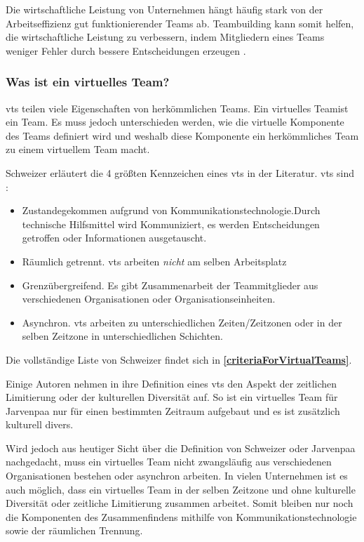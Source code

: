 \documentclass[a4paper,11pt]{article}%
\renewcommand{\\}{\vspace*{0.5\baselineskip} \newline}
\begin{document}
Die wirtschaftliche Leistung von Unternehmen hängt häufig stark von der Arbeitseffizienz gut funktionierender Teams ab. Teambuilding kann somit helfen, die wirtschaftliche Leistung zu verbessern, indem Mitgliedern eines Teams weniger Fehler durch bessere Entscheidungen erzeugen \citep[p. 1-6]{biech2007pfeiffer}.

\subsubsection{Was ist ein virtuelles Team?}
\label{vts}

\ac{vts} teilen viele Eigenschaften von herkömmlichen Teams. Ein \dq virtuelles Team\dq ist ein \dq Team\dq. Es muss jedoch unterschieden werden, wie die virtuelle Komponente des Teams definiert wird und weshalb diese Komponente ein herkömmliches Team zu einem virtuellem Team macht. 

Schweizer \citep[p.270]{schweitzer2010conceptualizing} erläutert die 4 größten Kennzeichen eines \ac{vts} in der Literatur.
\ac{vts} sind :
\begin{itemize}
\item Zustandegekommen aufgrund von Kommunikationstechnologie.Durch technische Hilfsmittel wird Kommuniziert, es werden Entscheidungen getroffen oder Informationen ausgetauscht.
\item Räumlich getrennt. \ac{vts} arbeiten \textit{nicht} am selben Arbeitsplatz
\item Grenzübergreifend. Es gibt Zusammenarbeit der Teammitglieder aus verschiedenen Organisationen oder Organisationseinheiten.
\item Asynchron. \ac{vts} arbeiten zu unterschiedlichen Zeiten/Zeitzonen oder in der selben Zeitzone in unterschiedlichen Schichten.
\end{itemize}

Die vollständige Liste von Schweizer findet sich in \textbf{\autoref{criteriaForVirtualTeams}}.

Einige Autoren nehmen in ihre Definition eines \ac{vts} den Aspekt der zeitlichen Limitierung oder der kulturellen Diversität auf. So ist ein virtuelles Team für Jarvenpaa \citep[p.1-2]{jarvenpaa1999communication} nur für einen bestimmten Zeitraum aufgebaut und es ist zusätzlich kulturell divers. 

Wird jedoch aus heutiger Sicht über die Definition von Schweizer oder Jarvenpaa nachgedacht, muss ein virtuelles Team nicht zwangsläufig aus verschiedenen Organisationen bestehen oder asynchron arbeiten. In vielen Unternehmen ist es auch möglich, dass ein virtuelles Team in der selben Zeitzone und ohne kulturelle Diversität oder zeitliche Limitierung zusammen arbeitet.
Somit bleiben nur noch die Komponenten des Zusammenfindens mithilfe von Kommunikationstechnologie sowie der räumlichen Trennung.
\end{document}
